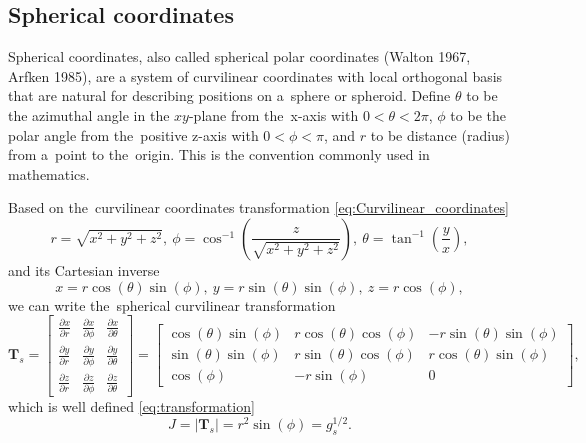 \documentclass[preprint,12pt]{elsarticle}
\newcommand{\pdv}[2]{\frac{\partial{#1}}{\partial{#2}}}
\newcommand{\matr}[1]{\mathbf{#1}}
\begin{document}
\subsection{Spherical coordinates}
Spherical coordinates, also called spherical polar coordinates 
(Walton 1967, Arfken 1985), are a system of curvilinear coordinates with 
local orthogonal basis that are natural for describing positions on a~sphere 
or spheroid. Define $\theta$ to be the azimuthal angle in the $xy$-plane from 
the~x-axis with $0<\theta<2\pi$, $\phi$ to be the polar angle from 
the~positive z-axis with $0<\phi<\pi$, and $r$ to be distance (radius) from 
a~point to the~origin. This is the convention commonly used in mathematics. 

Based on the~curvilinear coordinates transformation 
\eqref{eq:Curvilinear_coordinates}
\begin{equation}
  r = \sqrt{x^2 + y^2 + z^2} ,~ 
  \phi = \cos^{-1} \left( \frac{z}{\sqrt{x^2 + y^2 + z^2}} \right),~
  \theta = \tan^{-1}\left( \frac{y}{x} \right) ,
  \label{eq:spher_curvilinear_transformation}
\end{equation}
and its Cartesian inverse
\begin{equation}
  x = r \cos(\theta)\sin(\phi) ,~ 
  y = r \sin(\theta)\sin(\phi) ,~ 
  z = r \cos(\phi),
  \label{eq:spher_Cartesian_transformation}
\end{equation}
we can write the~spherical curvilinear transformation
\begin{equation}
  \matr{T}_{s} = \begin{bmatrix}
        \pdv{x}{r} & \pdv{x}{\phi} & \pdv{x}{\theta} \\
        \pdv{y}{r} & \pdv{y}{\phi} & \pdv{y}{\theta} \\
        \pdv{z}{r} & \pdv{z}{\phi} & \pdv{z}{\theta} 
	  \end{bmatrix}
  = \begin{bmatrix}
  \cos(\theta)\sin(\phi) & r\cos(\theta)\cos(\phi) & -r\sin(\theta)\sin(\phi) \\
  \sin(\theta)\sin(\phi) & r\sin(\theta)\cos(\phi) & r\cos(\theta)\sin(\phi) \\
  \cos(\phi) & -r\sin(\phi) & 0  
  \end{bmatrix} ,
  \label{eq:spher_transformation}
\end{equation}
which is well defined \eqref{eq:transformation}
\begin{equation}
  J = |\matr{T}_{s}| = r^2\sin(\phi) = g_s^{1/2}.
  \label{eq:spher_J}
\end{equation}
\end{document}
